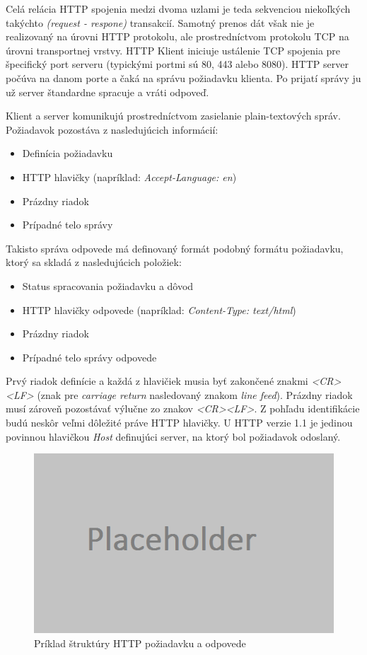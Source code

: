 \documentclass[
  printed, %
  table,   %
  lof,     %
  lot,     %
]{fithesis3}
\begin{document}
Celá relácia HTTP spojenia medzi dvoma uzlami je teda sekvenciou niekoľkých
takýchto \textit{(request - respone)} transakcií. Samotný prenos dát však nie
je realizovaný na úrovni HTTP protokolu, ale prostredníctvom protokolu TCP
na úrovni transportnej vrstvy. HTTP Klient iniciuje ustálenie TCP spojenia pre
špecifický port serveru (typickými portmi sú 80, 443 alebo 8080). HTTP server
počúva na danom porte a čaká na správu požiadavku klienta. Po prijatí správy ju
už server štandardne spracuje a vráti odpoveď. 

Klient a server komunikujú prostredníctvom zasielanie plain-textových správ.
Požiadavok pozostáva z nasledujúcich informácií: 
\begin{itemize}
	\item Definícia požiadavku
	\item HTTP hlavičky (napríklad: \textit{Accept-Language: en})
	\item Prázdny riadok
	\item Prípadné telo správy
\end{itemize}

Takisto správa odpovede má definovaný formát podobný formátu požiadavku, ktorý
sa skladá z nasledujúcich položiek:
\begin{itemize}
	\item Status spracovania požiadavku a dôvod
	\item HTTP hlavičky odpovede (napríklad: \textit{Content-Type: text/html})
	\item Prázdny riadok
	\item Prípadné telo správy odpovede
\end{itemize}

Prvý riadok definície a každá z hlavičiek musia byť zakončené znakmi
\textit{<CR><LF>}
(znak pre \textit{carriage return} nasledovaný znakom \textit{line feed}).
Prázdny riadok musí zároveň pozostávať výlučne zo znakov \textit{<CR><LF>}.
Z pohľadu identifikácie budú neskôr veľmi dôležité práve HTTP hlavičky. U HTTP
verzie 1.1 je jedinou povinnou hlavičkou \textit{Host} definujúci server, na
ktorý bol požiadavok odoslaný.

\begin{figure}[h]
  \centering
    \includegraphics[width=.80\textwidth]{images/net-http.png}
  \caption{Príklad štruktúry HTTP požiadavku a odpovede}
  \label{fig:net-http}
\end{figure}
\end{document}

